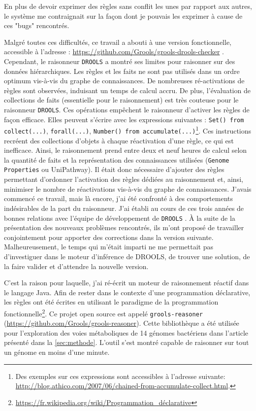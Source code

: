 \begin{refsegment}
En plus de devoir exprimer des règles sans conflit les unes par rapport aux autres, le système me contraignait sur la façon dont je pouvais les exprimer à cause de ces "bugs" rencontrés.

Malgré toutes ces difficultés, ce travail a abouti à une version fonctionnelle, accessible à l'adresse : \url{https://github.com/Grools/grools-drools-checker} . Cependant, le raisonneur \texttt{DROOLS} a montré ses limites pour raisonner sur des données hiérarchiques. Les règles et les faits ne sont pas utilisés dans un ordre optimum vis-à-vis du graphe de connaissances. De nombreuses ré-activations de règles sont observées, induisant un temps de calcul accru. De plus, l'évaluation de collections de faits (essentielle pour le raisonnement) est très couteuse pour le raisonneur \texttt{DROOLS}. Ces opérations empêchent le raisonneur d'activer les règles de façon efficace. Elles peuvent s'écrire avec les expressions suivantes : \lstinline[style=drl-style]$Set() from collect(...)$, \lstinline[style=drl-style]$forall(...)$, \lstinline[style=drl-style]$Number() from accumulate(...)$\footnote{Des exemples sur ces expressions sont accessibles à l'adresse suivante: \url{http://blog.athico.com/2007/06/chained-from-accumulate-collect.html}.}. Ces instructions recréent des collections d'objets à chaque réactivation d'une règle, ce qui est inefficace. Ainsi, le raisonnement prend entre deux et neuf heures de calcul selon la quantité de faits et la représentation des connaissances utilisées (\texttt{Genome Properties} ou UniPathway). Il était donc nécessaire d'ajouter des règles permettant d'ordonner l'activation des règles dédiées au raisonnement et, ainsi, minimiser le nombre de réactivations vis-à-vis du graphe de connaissances. J'avais commencé ce travail, mais là encore, j'ai été confronté à des comportements indésirables de la part du raisonneur. J'ai établi au cours de ces trois années de bonnes relations avec l'équipe de développement de \texttt{DROOLS} . À la suite de la présentation  des nouveaux problèmes rencontrés, ils m'ont proposé de travailler conjointement pour apporter des corrections dans la version suivante. Malheureusement, le temps qui m'était imparti ne me permettait pas d'investiguer dans le moteur d'inférence de DROOLS, de trouver une solution, de la faire valider et d'attendre la nouvelle version.

C'est la raison pour laquelle, j'ai ré-écrit un moteur de raisonnement réactif dans le langage Java. Afin de rester dans le contexte d'une programmation déclarative, les règles ont été écrites en utilisant le paradigme de la programmation fonctionnelle\footnote{\url{https://fr.wikipedia.org/wiki/Programmation_déclarative}}. Ce projet open source est appelé \texttt{grools-reasoner} (\url{https://github.com/Grools/grools-reasoner}). Cette bibliothèque a été utilisée pour l'exploration des voies métaboliques de 14 génomes bactériens dans l'article présenté dans la  \cref{sec:methode}. L'outil s'est montré capable de raisonner sur tout un génome en moins d'une minute.


\end{refsegment}
